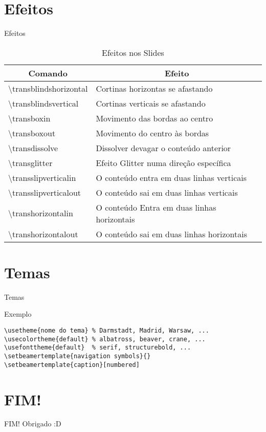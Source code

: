 \documentclass{beamer}
\begin{document}
\section{Efeitos}
\begin{frame}[fragile]{Efeitos}
\begin{table}[]
\centering
\caption{Efeitos nos Slides}
\label{my-table1}
\begin{tabular}{|l|l|}
\hline
\multicolumn{1}{|c|}{\textbf{Comando}} & \multicolumn{1}{c|}{\textbf{Efeito}}      \\ \hline
\textbackslash{}transblindshorizontal  &  Cortinas horizontas se afastando          \\ \hline
\textbackslash{}transblindsvertical    &  Cortinas verticais se afastando            \\ \hline
\textbackslash{}transboxin             &  Movimento das bordas ao centro              \\ \hline
\textbackslash{}transboxout            &  Movimento do centro às bordas       		   \\ \hline
\textbackslash{}transdissolve          &  Dissolver devagar o conteúdo anterior         \\ \hline
\textbackslash{}transglitter           &  Efeito Glitter numa direção específica         \\ \hline
\textbackslash{}transslipverticalin    &  O conteúdo entra em duas linhas verticais       \\ \hline
\textbackslash{}transslipverticalout   &  O conteúdo sai em duas linhas verticais          \\ \hline
\textbackslash{}transhorizontalin      &  O conteúdo Entra em duas linhas horizontais       \\ \hline
\textbackslash{}transhorizontalout     &  O conteúdo sai em duas linhas horizontais          \\ \hline
\end{tabular}
\end{table}
\end{frame}

\section{Temas}
\begin{frame}[fragile]{Temas}
\begin{block}{Exemplo}
\begin{verbatim}
\usetheme{nome do tema} % Darmstadt, Madrid, Warsaw, ...
\usecolortheme{default} % albatross, beaver, crane, ...
\usefonttheme{default}  % serif, structurebold, ...
\setbeamertemplate{navigation symbols}{}
\setbeamertemplate{caption}[numbered]
\end{verbatim}
\end{block}
\href{https://hartwork.org/beamer-theme-matrix/}{}
\end{frame}

\section{FIM!}
\begin{frame}{FIM!}
Obrigado :D
\end{frame}
\end{document}
